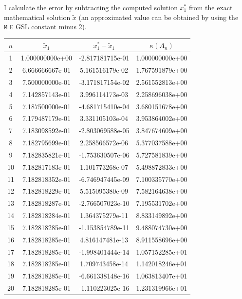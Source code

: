 \documentclass{article}
\newcommand{\code}{\texttt}
\begin{document}
I calculate the error by subtracting the computed solution $x_{1}^{\ast}$ from the exact mathematical solution $\widetilde{x}$ (an approximated value can be obtained by using the $\code{M\_E}$ GSL constant minus 2).\\

\begin{table}[htb]
\centering %
\begin{tabular}{c c c c} %
$n$ & $\widetilde{x}_1$ & $x_1^{\ast}- \widetilde{x}_1$ & $\kappa(A_n)$ \\ [0.65ex] %
\hline %
1 & 1.000000000e+00 & -2.817181715e-01 & 1.000000000e+00 \\
2 & 6.666666667e-01 & 5.161516179e-02 & 1.767591879e+00 \\
3 & 7.500000000e-01 & -3.171817154e-02 & 2.561552813e+00 \\
4 & 7.142857143e-01 & 3.996114173e-03 & 2.258696038e+00 \\
5 & 7.187500000e-01 & -4.681715410e-04 & 3.680151678e+00 \\
6 & 7.179487179e-01 & 3.331105103e-04 & 3.953864002e+00 \\
7 & 7.183098592e-01 & -2.803069588e-05 & 3.847674609e+00 \\
8 & 7.182795699e-01 & 2.258566572e-06 & 5.377037588e+00 \\
9 & 7.182835821e-01 & -1.753630507e-06 & 5.727581839e+00 \\
10 & 7.182817183e-01 & 1.101773268e-07 & 5.498872833e+00 \\
11 & 7.182818352e-01 & -6.746947445e-09 & 7.100335770e+00 \\
12 & 7.182818229e-01 & 5.515095380e-09 & 7.582164638e+00 \\
13 & 7.182818287e-01 & -2.766507023e-10 & 7.195531702e+00 \\
14 & 7.182818284e-01 & 1.364375279e-11 & 8.833149892e+00 \\
15 & 7.182818285e-01 & -1.153854789e-11 & 9.488074730e+00 \\
16 & 7.182818285e-01 & 4.816147481e-13 & 8.911558696e+00 \\
17 & 7.182818285e-01 & -1.998401444e-14 & 1.057152285e+01 \\
18 & 7.182818285e-01 & 1.709743458e-14 & 1.142018246e+01 \\
19 & 7.182818285e-01 & -6.661338148e-16 & 1.063813407e+01 \\
20 & 7.182818285e-01 & -1.110223025e-16 & 1.231319966e+01 \\

\end{tabular}
\end{table}
\end{document}
